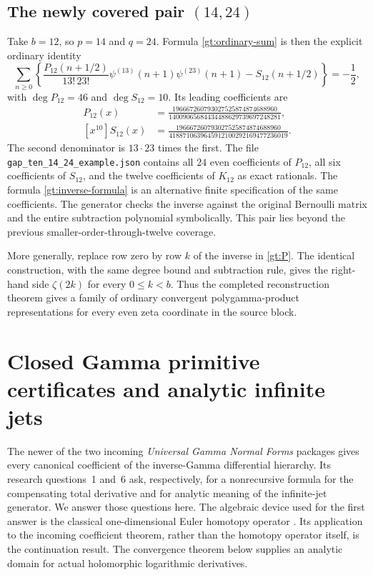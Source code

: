 \documentclass[11pt,a4paper]{article}
\theoremstyle{definition}
\theoremstyle{remark}
\numberwithin{equation}{section}
\begin{document}
\subsection[The newly covered pair (14,24)]{The newly covered pair $(14,24)$}

Take $b=12$, so $p=14$ and $q=24$. Formula \eqref{gt:ordinary-sum}
is then the explicit ordinary identity
\[
 \sum_{n\ge0}\left\{
 \frac{P_{12}(n+1/2)}{13!\,23!}
 \psi^{(13)}(n+1)\psi^{(23)}(n+1)-S_{12}(n+1/2)
                         \right\}=-\frac12,
\]
with $\deg P_{12}=46$ and $\deg S_{12}=10$. Its leading coefficients are
\begin{align*}
 [x^{46}]P_{12}(x)
 &=\frac{196667260793027525874874688960}
          {14009065684434488629739697248281},\\
 [x^{10}]S_{12}(x)
 &=\frac{196667260793027525874874688960}
          {4188710639645912100292169477236019}.
\end{align*}
The second denominator is $13\cdot23$ times the first.
The file \texttt{gap\_ten\_14\_24\_example.json} contains all $24$
even coefficients of $P_{12}$, all six coefficients of $S_{12}$,
and the twelve coefficients of $K_{12}$ as exact rationals.
The formula \eqref{gt:inverse-formula} is an alternative finite
specification of the same coefficients. The generator checks the
inverse against the original Bernoulli matrix and the entire
subtraction polynomial symbolically. This pair lies beyond the
previous smaller-order-through-twelve coverage.

More generally, replace row zero by row $k$ of the inverse in
\eqref{gt:P}. The identical construction, with the same degree
bound and subtraction rule, gives the right-hand side
$\zeta(2k)$ for every $0\le k<b$. Thus the completed reconstruction
theorem gives a family of ordinary convergent polygamma-product
representations for every even zeta coordinate in the source block.

\section{Closed Gamma primitive certificates and analytic infinite jets}
\label{hp:section}

The newer of the two incoming \emph{Universal Gamma Normal Forms}
packages gives every canonical coefficient of the inverse-Gamma
differential hierarchy. Its research questions~1 and~6 ask, respectively,
for a nonrecursive formula for the compensating total derivative and
for analytic meaning of the infinite-jet generator. We answer those
questions here. The algebraic device used for the first answer is the
classical one-dimensional Euler homotopy operator
\cite{PooleHereman,HeremanDeconinckPoole}. Its application to the incoming
coefficient theorem, rather than the homotopy operator itself, is the
continuation result. The convergence theorem below supplies an analytic
domain for actual holomorphic logarithmic derivatives.
\end{document}
